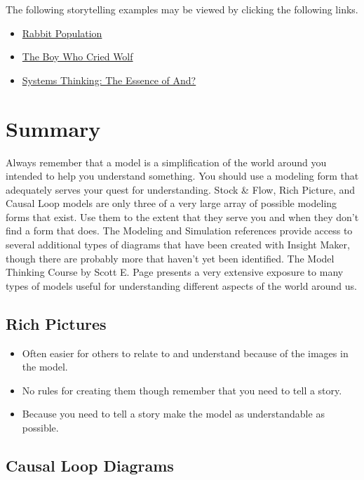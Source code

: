 \documentclass[]{memoir}
\begin{document}
The following storytelling examples may be viewed by clicking the
following links.

\begin{itemize}
\itemsep1pt\parskip0pt
\item
  \href{http://insightmaker.com/insight/7104}{Rabbit Population}
\item
  \href{http://insightmaker.com/insight/7103}{The Boy Who Cried Wolf}
\item
  \href{http://insightmaker.com/insight/3365}{Systems Thinking: The
  Essence of And?}
\end{itemize}

\section{Summary}

Always remember that a model is a simplification of the world around you
intended to help you understand something. You should use a modeling
form that adequately serves your quest for understanding. Stock \& Flow,
Rich Picture, and Causal Loop models are only three of a very large
array of possible modeling forms that exist. Use them to the extent that
they serve you and when they don't find a form that does. The Modeling
and Simulation references provide access to several additional types of
diagrams that have been created with Insight Maker, though there are
probably more that haven't yet been identified. The Model Thinking
Course by Scott E. Page presents a very extensive exposure to many types
of models useful for understanding different aspects of the world around
us.

\subsection{Rich Pictures}

\begin{itemize}
\itemsep1pt\parskip0pt
\item
  Often easier for others to relate to and understand because of the
  images in the model.
\item
  No rules for creating them though remember that you need to tell a
  story.
\item
  Because you need to tell a story make the model as understandable as
  possible.
\end{itemize}

\subsection{Causal Loop Diagrams}
\end{document}

